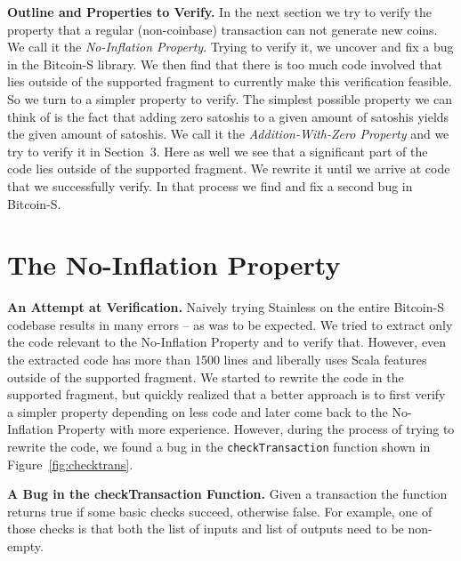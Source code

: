 \documentclass[hyphens, a4paper,USenglish,cleveref, autoref, thm-restate]{oasics-v2019}
\renewcommand{\paragraph}{\textbf}%
\begin{document}
\paragraph{Outline and Properties to Verify.} In the next section we
try to verify the property that a regular (non-coinbase) transaction
can not generate new coins. We call it the \emph{No-Inflation
  Property}. Trying to verify it, we uncover and fix a bug in the
Bitcoin-S library. We then find that there is too much code involved
that lies outside of the supported fragment to currently make this
verification feasible. So we turn to a simpler property to verify. The
simplest possible property we can think of is the fact that adding
zero satoshis to a given amount of satoshis yields the given amount of
satoshis. We call it the \emph{Addition-With-Zero Property} and we try
to verify it in Section~3. Here as well we see that a significant part
of the code lies outside of the supported fragment. We rewrite it
until we arrive at code that we successfully verify. In that process
we find and fix a second bug in Bitcoin-S.


\section{The No-Inflation Property}

\paragraph{An Attempt at Verification.} Naively trying Stainless on
the entire Bitcoin-S codebase results in many errors -- as was to be
expected. We tried to extract only the code relevant to the
No-Inflation Property and to verify that. However, even the extracted
code has more than 1500 lines and liberally uses Scala features
outside of the supported fragment. We started to rewrite the code in
the supported fragment, but quickly realized that a better approach is
to first verify a simpler property depending on less code and later
come back to the No-Inflation Property with more experience. However,
during the process of trying to rewrite the code, we found a bug in
the \texttt{checkTransaction} function shown in
Figure~\ref{fig:checktrans}.

\paragraph{A Bug in the checkTransaction Function.} Given a
transaction the function returns true if some basic checks succeed,
otherwise false. For example, one of those checks is that both the
list of inputs and list of outputs need to be non-empty.
\end{document}

